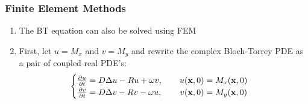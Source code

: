 \begin{frame}
\frametitle{Finite Element Methods}
\begin{enumerate}
    \item The BT equation can also be solved using FEM
    \item First, let $u=M_x$ and $v=M_y$ and rewrite the complex Bloch-Torrey PDE as a pair of coupled real PDE's:
    \begin{equation*}
    \begin{cases}
        \frac{\partial u}{\partial t} = D \mbox{$\Delta$}{u} - R u + \omega v, \qquad u(\mathbf{x},0) = M_x(\mathbf{x},0) \\
        \hspace{0.5pt}\frac{\partial v}{\partial t} = D \mbox{$\Delta$}{v} - R v - \omega u, \qquad \hspace{1pt} v(\mathbf{x},0) = M_y(\mathbf{x},0)
    \end{cases}
    \end{equation*}
\end{enumerate}
\end{frame}

